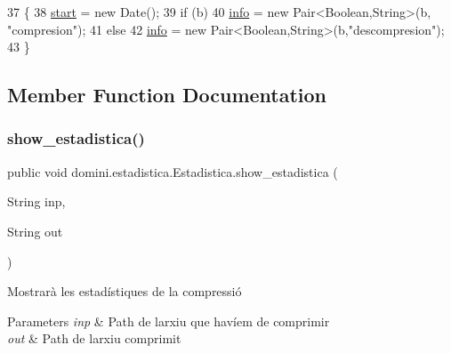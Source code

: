 \begin{DoxyCode}
37                                   \{
38         \hyperlink{classdomini_1_1estadistica_1_1Estadistica_aee0ae604272563ceab4e61392cbd343e}{start} = \textcolor{keyword}{new} Date();
39         \textcolor{keywordflow}{if} (b) 
40             \hyperlink{classdomini_1_1estadistica_1_1Estadistica_a57776a71683b3717b638377073b8a99e}{info} = \textcolor{keyword}{new} Pair<Boolean,String>(b, \textcolor{stringliteral}{"compresion"});
41         \textcolor{keywordflow}{else} 
42             \hyperlink{classdomini_1_1estadistica_1_1Estadistica_a57776a71683b3717b638377073b8a99e}{info} = \textcolor{keyword}{new} Pair<Boolean,String>(b,\textcolor{stringliteral}{"descompresion"});
43     \}
\end{DoxyCode}


\subsection{Member Function Documentation}
\mbox{\label{classdomini_1_1estadistica_1_1Estadistica_a6cac6971be817fd985afb8f3b6725464}} 
\subsubsection{\texorpdfstring{show\+\_\+estadistica()}{show\_estadistica()}}
{\footnotesize\ttfamily public void domini.\+estadistica.\+Estadistica.\+show\+\_\+estadistica (\begin{DoxyParamCaption}\item[{String}]{inp,  }\item[{String}]{out }\end{DoxyParamCaption})\hspace{0.3cm}{\ttfamily [inline]}}



Mostrarà les estadístiques de la compressió 


\begin{DoxyParams}{Parameters}
{\em inp} & Path de l\textquotesingle{}arxiu que havíem de comprimir \\
\hline
{\em out} & Path de l\textquotesingle{}arxiu comprimit \\
\hline
\end{DoxyParams}

